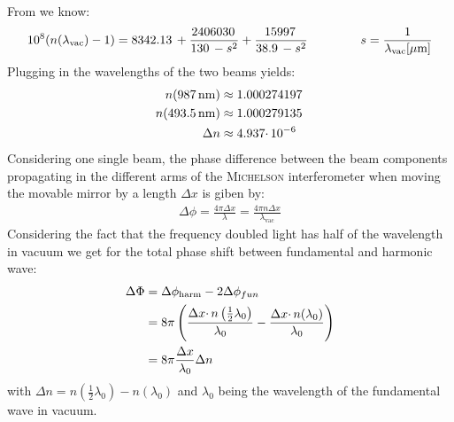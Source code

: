 \documentclass{protokoll_en}
\begin{document}
From \cite{paper} we know:
\begin{align}
10^8(n(\lambda_\textrm{vac})-1)=\unit[8342.13]{} + \frac{\unit[2406030]{}}{\unit[130]{} - s^2} + \frac{\unit[15997]{}}{\unit[38.9]{}-s^2} \hspace{1.5cm} s=\frac{1}{\lambda_\textrm{vac}[\mu\textrm{m}]}
\end{align}
Plugging in the wavelengths of the two beams yields:
\begin{align}
n(\unit[987]{nm}) &\approx \unit[1.000274197]{}\\
\notag n(\unit[493.5]{nm}) &\approx \unit[1.000279135]{}\\
\notag\Delta n &\approx \unit[4.937\cdotp 10^{-6}]{}
\end{align}
Considering one single beam, the phase difference between the beam components propagating in the different arms of the \textsc{Michelson} interferometer when moving the movable mirror by a length $\Delta x$ is giben by:
\begin{align}
\Delta \phi = \frac{4\pi\Delta x}{\lambda}=\frac{4\pi n\Delta x}{\lambda_\textrm{vac}}
\end{align}
Considering the fact that the frequency doubled light has half of the wavelength in vacuum we get for the total phase shift between fundamental and harmonic wave:
\begin{align}
\Delta \Phi &= \Delta \phi_\textrm{harm} - 2\Delta \phi_{fun}\\
\notag &= 8\pi\left(\frac{\Delta x \cdotp n\left(\frac{1}{2}\lambda_0\right)}{\lambda_0} - \frac{\Delta x\cdotp n(\lambda_0)}{\lambda_0}\right)\\
\notag &= 8\pi\frac{\Delta x}{\lambda_0} \Delta n
\end{align}
with $\Delta n = n\left(\frac{1}{2}\lambda_0\right)-n(\lambda_0)$ and $\lambda_0$ being the wavelength of the fundamental wave in vacuum.
\end{document}
